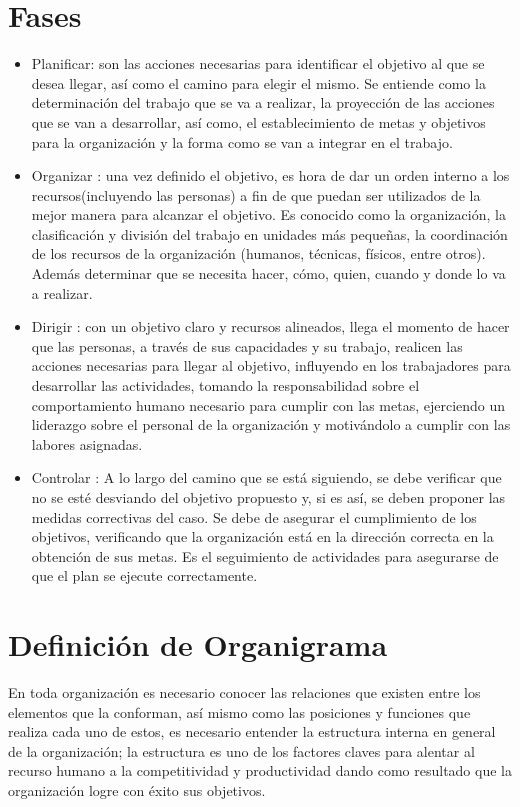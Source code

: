 \documentclass[letterpaper,12pt]{article}
\begin{document}
\begin{sloppypar}
\section{Fases}
\begin{itemize}
    \item Planificar: son las acciones necesarias para identificar el objetivo al que se desea llegar, así como el camino para elegir el mismo. Se entiende como la determinación del trabajo que se va a realizar, la proyección de las acciones que se van a desarrollar, así como, el establecimiento de metas y objetivos para la organización y la forma como se van a integrar en el trabajo. 
    \item Organizar : una vez definido el objetivo, es hora de dar un orden interno a los recursos(incluyendo las personas) a fin de que puedan ser utilizados de la mejor manera para alcanzar el objetivo. Es conocido como la organización, la clasificación y división del trabajo en unidades más pequeñas, la coordinación de los recursos de la organización (humanos, técnicas, físicos, entre otros). Además determinar que se necesita hacer, cómo, quien, cuando y donde lo va a realizar.
    \item Dirigir : con un  objetivo claro y recursos alineados, llega el momento de hacer que las personas, a través de sus capacidades y su trabajo, realicen las acciones necesarias para llegar al objetivo, influyendo en los trabajadores para desarrollar las actividades, tomando la responsabilidad sobre el comportamiento humano necesario para cumplir con las metas, ejerciendo un liderazgo sobre el personal de la organización y motivándolo a cumplir con las labores asignadas. 
    \item Controlar : A lo largo del camino que se está siguiendo, se debe verificar que no se esté desviando del objetivo propuesto y, si es así, se deben proponer las medidas correctivas del caso. Se debe de asegurar el cumplimiento de los objetivos, verificando que la organización está en la dirección correcta en la obtención de sus metas. Es el seguimiento de actividades para asegurarse de que el plan se ejecute correctamente. 
\end{itemize}
\section{Definición de Organigrama}
En toda organización es necesario conocer las relaciones que existen entre los elementos que la conforman, así mismo como las posiciones y funciones que realiza cada uno de estos, es necesario entender la estructura interna en general de  la organización; la estructura  es uno de los factores claves para alentar al recurso humano a la competitividad y productividad dando como resultado que la organización logre con éxito sus objetivos.


\end{sloppypar}
\end{document}
